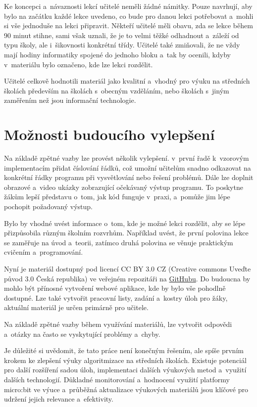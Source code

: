 \documentclass[
  digital,     %
  oneside,     %
  nosansbold,  %
  colorbold, %
  lof,         %
  nolot,         %
]{fithesis4}
\begin{document}
Ke koncepci a~návaznosti lekcí učitelé neměli žádné námitky. Pouze navrhují, aby bylo na začátku každé lekce uvedeno, co bude pro danou lekci potřebovat a~mohli si vše jednoduše na lekci připravit. Někteří učitelé měli obavu, zda se lekce během 90 minut stihne, sami však uznali, že je to velmi těžké odhadnout a~záleží od typu školy, ale i~šikovnosti konkrétní třídy.  Učitelé také zmiňovali, že ne vždy mají hodiny informatiky spojené do jednoho bloku a~tak by ocenili, kdyby v~materiálu bylo označeno, kde lze lekci rozdělit. 

Učitelé celkově hodnotili materiál jako kvalitní a~vhodný pro výuku na středních školách především na školách s~obecným vzděláním, nebo školách s~jiným zaměřením než jsou informační technologie.

\section{Možnosti budoucího vylepšení}
Na základě zpětné vazby lze provést několik vylepšení. v~první řadě k~vzorovým implementacím přidat číslování řádků, což umožní učitelům snadno odkazovat na konkrétní řádky programu při vysvětlování nebo řešení problémů. Dále lze doplnit obrazové a~video ukázky zobrazující očekávaný výstup programu. To poskytne žákům lepší představu o~tom, jak kód funguje v~praxi, a~pomůže jim lépe pochopit požadovaný výstup.

Bylo by vhodné uvést informace o~tom, kde je možné lekci rozdělit, aby se lépe přizpůsobila různým školním rozvrhům. Například uvést, že první polovina lekce se zaměřuje na úvod a~teorii, zatímco druhá polovina se věnuje praktickým cvičením a~programování.

Nyní je materiál dostupný pod licencí CC BY 3.0 CZ (Creative commons Uveďte původ 3.0 Česká republika) ve veřejném repozitáři na \href{https://github.com/denisa-mat/BP-microbit/tree/lekce-00}{GitHubu}. Do budoucna by mohlo být přínosné vytvoření webové aplikace, kde by bylo vše pohodlně dostupné. Lze také vytvořit pracovní listy, zadání a~kostry úloh pro žáky, aktuální materiál je určen primárně pro učitele.

Na základě zpětné vazby během využívání materiálů, lze vytvořit odpovědi a~otázky na často se vyskytující problémy a~chyby.

Je důležité si uvědomit, že tato práce není konečným řešením, ale spíše prvním krokem ke zlepšení výuky algoritmizace na středních školách. Existuje potenciál pro další rozšíření sadou úloh, implementaci dalších výukových metod a~využití dalších technologií. Důkladné monitorování a~hodnocení využití platformy micro:bit ve výuce a~průběžná aktualizace výukových materiálů jsou klíčové pro udržení jejich relevance a~efektivity.
\end{document}
